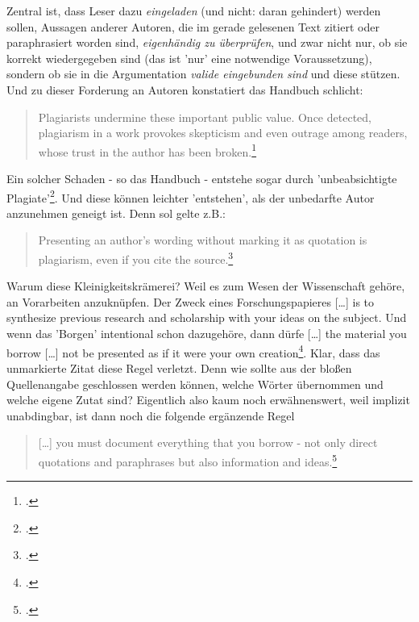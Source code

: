 Zentral ist, dass Leser dazu \textit{eingeladen} (und nicht: daran gehindert)
werden sollen, Aussagen anderer Autoren, die im gerade gelesenen Text zitiert
oder paraphrasiert worden sind, \textit{eigenhändig zu überprüfen}, und zwar
nicht nur, ob sie korrekt wiedergegeben sind (das ist 'nur' eine notwendige
Voraussetzung), sondern ob sie in die Argumentation \textit{valide eingebunden
sind} und diese stützen. Und zu dieser Forderung an Autoren konstatiert das
Handbuch schlicht:

\begin{quote} \glqq{}Plagiarists undermine these important public value.
Once detected, plagiarism in a work provokes skepticism and even outrage
among readers, whose trust in the author has been
broken.\grqq{}\footcite[][52f]{ModLanAss2009a}
\end{quote}

Ein solcher Schaden - so das Handbuch - entstehe sogar durch 'unbeabsichtigte
Plagiate'\footcite[vgl.][55 - im Original \glqq{}unintenional
plagiarism\grqq{}]{ModLanAss2009a}. Und diese können leichter 'entstehen', als
der unbedarfte Autor anzunehmen geneigt ist. Denn sol gelte z.B.:

\begin{quote}\glqq{}Presenting an author's wording without marking it as
quotation is plagiarism, even if you cite the source.\grqq{}\footcite[][55
(herv.KR.)]{ModLanAss2009a}
\end{quote}

Warum diese Kleinigkeitskrämerei? Weil es zum Wesen der Wissenschaft gehöre, an
Vorarbeiten anzuknüpfen. Der Zweck eines Forschungspapieres \glqq{}[\ldots] is
to synthesize previous research and scholarship with your ideas on the
subject\grqq{}. Und wenn das 'Borgen' intentional schon dazugehöre, dann dürfe
\glqq{}[\ldots] the material you borrow [\ldots] not be presented as if it were
your own creation\grqq{}\footcite[vgl.][55]{ModLanAss2009a}. Klar, dass das
unmarkierte Zitat diese Regel verletzt. Denn wie sollte aus der bloßen
Quellenangabe geschlossen werden können, welche Wörter übernommen und welche
eigene Zutat sind? Eigentlich also kaum noch erwähnenswert, weil implizit
unabdingbar, ist dann noch die folgende ergänzende Regel

\begin{quote} \glqq{}[\ldots] you must document everything that you borrow - not
only direct quotations and paraphrases but also information and
ideas.\grqq{}\footcite[][52f]{ModLanAss2009a}
\end{quote}

